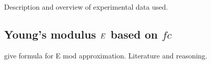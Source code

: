 Description and overview of experimental data used.

\subsection{Young's modulus \texorpdfstring{$E$}{E} based on \texorpdfstring{$fc$}{fc}}
give formula for E mod approximation.
Literature and reasoning.
